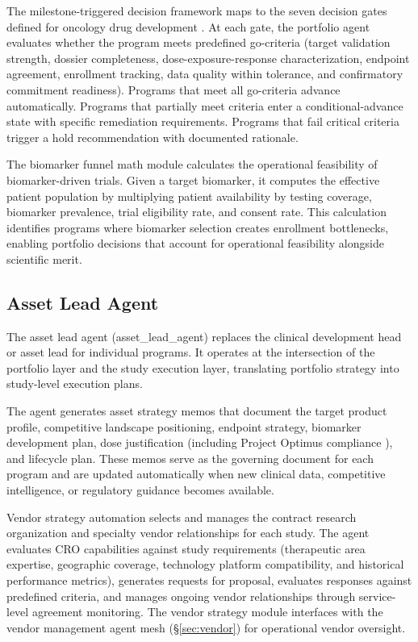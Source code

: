 The milestone-triggered decision framework maps to the seven decision gates defined for
oncology drug development \cite{tufts-csdd-cost}. At each gate, the portfolio agent evaluates
whether the program meets predefined go-criteria (target validation strength, dossier
completeness, dose-exposure-response characterization, endpoint agreement, enrollment
tracking, data quality within tolerance, and confirmatory commitment readiness). Programs
that meet all go-criteria advance automatically. Programs that partially meet criteria enter
a conditional-advance state with specific remediation requirements. Programs that fail
critical criteria trigger a hold recommendation with documented rationale.

The biomarker funnel math module calculates the operational feasibility of biomarker-driven
trials. Given a target biomarker, it computes the effective patient population by
multiplying patient availability by testing coverage, biomarker prevalence, trial
eligibility rate, and consent rate. This calculation identifies programs where biomarker
selection creates enrollment bottlenecks, enabling portfolio decisions that account for
operational feasibility alongside scientific merit.

\subsection{Asset Lead Agent}

The asset lead agent (asset\_lead\_agent) replaces the clinical development head or asset lead
for individual programs. It operates at the intersection of the portfolio layer and the study
execution layer, translating portfolio strategy into study-level execution plans.

The agent generates asset strategy memos that document the target product profile, competitive
landscape positioning, endpoint strategy, biomarker development plan, dose justification
(including Project Optimus compliance \cite{fda-project-optimus}), and lifecycle plan. These
memos serve as the governing document for each program and are updated automatically when
new clinical data, competitive intelligence, or regulatory guidance becomes available.

Vendor strategy automation selects and manages the contract research organization and
specialty vendor relationships for each study. The agent evaluates CRO capabilities against
study requirements (therapeutic area expertise, geographic coverage, technology platform
compatibility, and historical performance metrics), generates requests for proposal,
evaluates responses against predefined criteria, and manages ongoing vendor relationships
through service-level agreement monitoring. The vendor strategy module interfaces with the
vendor management agent mesh (\S\ref{sec:vendor}) for operational vendor oversight.

